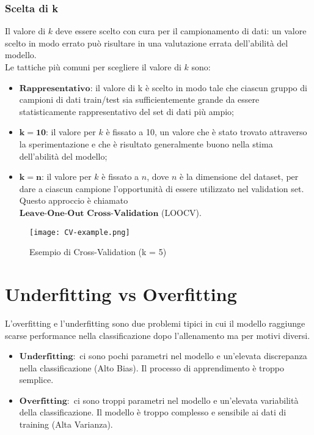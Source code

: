 		\subsubsection{Scelta di k}
			Il valore di $k$ deve essere scelto con cura per il campionamento di dati: un valore scelto in modo errato può risultare in una valutazione errata dell'abilità del modello.
			\\[1\baselineskip]
			Le tattiche più comuni per scegliere il valore di $k$ sono:

			\begin{itemize}
				\item $\textbf{Rappresentativo}$: il valore di k è scelto in modo tale che ciascun gruppo di campioni di dati train/test sia sufficientemente grande da essere statisticamente rappresentativo del set di dati più ampio;
				\item $\boldsymbol{k=10}$: il valore per $k$ è fissato a 10, un valore che è stato trovato attraverso la sperimentazione e che è risultato generalmente buono nella stima dell'abilità del modello;
				\item $\boldsymbol{k=n}$: il valore per $k$ è fissato a $n$, dove $n$ è la dimensione del dataset, per dare a ciascun campione l'opportunità di essere utilizzato nel validation set.
					\\
					Questo approccio è chiamato
					\\
					$\textbf{Leave-One-Out Cross-Validation}$ (LOOCV).
			\end{itemize}

		\begin{figure}[h]
			\caption{Esempio di Cross-Validation (k = 5)}
			\centering
			\texttt{[image: CV-example.png]}
		\end{figure}

	\clearpage

	\section{Underfitting vs Overfitting}
		L'overfitting e l'underfitting sono due problemi tipici in cui il modello raggiunge scarse performance nella classificazione dopo l'allenamento ma per motivi diversi.
			\begin{itemize}
				\item $\textbf{Underfitting}:$ ci sono pochi parametri nel modello e un'elevata discrepanza nella classificazione (Alto Bias).
				Il processo di apprendimento è troppo semplice.

				\item $\textbf{Overfitting}:$ ci sono troppi parametri nel modello e un'elevata variabilità della classificazione.
					Il modello è troppo complesso e sensibile ai dati di training (Alta Varianza).
			\end{itemize}

